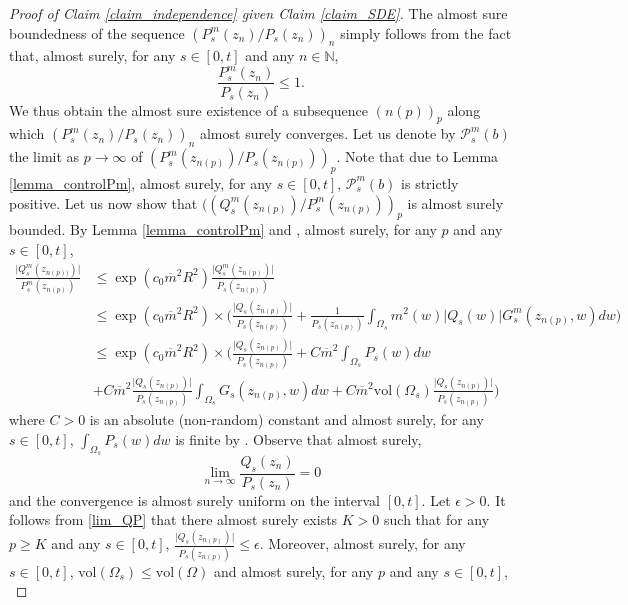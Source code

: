 \documentclass{article}
\newcommand{\eps}{{\epsilon}}
\theoremstyle{definition}
\theoremstyle{remark}
\theoremstyle{remark}
\begin{document}
\begin{proof}[Proof of Claim \ref{claim_independence} given Claim \ref{claim_SDE}]
The almost sure boundedness of the sequence $(P_s^m(z_n)/P_s(z_n))_n$ simply follows from the fact that, almost surely, for any $s \in [0,t]$ and any $n \in \mathbb{N}$,
\begin{equation*}
    \frac{P_s^m(z_n)}{P_s(z_n)} \leq 1.
\end{equation*}
We thus obtain the almost sure existence of a subsequence $(n(p))_p$ along which $(P_s^m(z_n)/P_s(z_n))_n$ almost surely converges. Let us denote by $\mathcal{P}_s^m(b)$ the limit as $p \to \infty$ of $(P_s^m(z_{n(p)})/P_s(z_{n(p)}))_p$. Note that due to Lemma \ref{lemma_controlPm}, almost surely, for any $s \in [0,t]$, $\mathcal{P}_s^m(b)$ is strictly positive. Let us now show that $((Q_s^m(z_{n(p)})/P_s^m(z_{n(p)}))_p$ is almost surely bounded. By Lemma \ref{lemma_controlPm} and \cite[Equation~(4.7)]{mLERW}, almost surely, for any $p$ and any $s \in [0,t]$,
\begin{align*}
    \frac{\vert Q_s^m(z_{n(p))}) \vert}{P_s^m(z_{n(p)})} &\leq \exp(c_0\overline{m}^2R^2) \frac{\vert Q_s^m(z_{n(p)}) \vert}{P_s(z_{n(p)})}\\
    &\leq \exp(c_0\overline{m}^2R^2) \times \bigg( \frac{\vert Q_s(z_{n(p)}) \vert}{P_s(z_{n(p)})} + \frac{1}{P_s(z_{n(p)})} \int_{\Omega_s} m^2(w) \vert Q_s(w) \vert G_s^m(z_{n(p)},w) dw \bigg)\\
    &\leq \exp(c_0\overline{m}^2R^2) \times \bigg(\frac{\vert Q_s(z_{n(p)}) \vert}{P_s(z_{n(p)})} + C\overline{m}^2\int_{\Omega_s}P_s(w) dw \\
    &+C\overline{m}^2\frac{\vert Q_s(z_{n(p)}) \vert}{P_s(z_{n(p)})} \int_{\Omega_s} G_s(z_{n(p)},w) dw
    + C\overline{m}^2\text{vol}(\Omega_s)\frac{\vert Q_s(z_{n(p)}) \vert}{P_s(z_{n(p)})} \bigg)
\end{align*}
where $C>0$ is an absolute (non-random) constant and almost surely, for any $s \in [0,t]$, $\int_{\Omega_s} P_s(w) dw$ is finite by \cite[Corollary~4.6(i)]{mLERW}. Observe that almost surely,
\begin{equation} \label{lim_QP}
    \lim_{n \to \infty} \frac{Q_s(z_n)}{P_s(z_n)} = 0
\end{equation}
and the convergence is almost surely uniform on the interval $[0,t]$. Let $\eps > 0$. It follows from \eqref{lim_QP} that there almost surely exists $K > 0$ such that for any $p \geq K$ and any $s \in [0,t]$, $\frac{\vert Q_s(z_{n(p)}) \vert}{P_s(z_{n(p)})} \leq \eps$. Moreover, almost surely, for any $s \in [0,t]$, $\text{vol}(\Omega_s) \leq \text{vol}(\Omega)$ and almost surely, for any $p$ and any $s \in [0,t]$,
\begin{equation*}

\end{equation*}
\end{proof}
\end{document}
